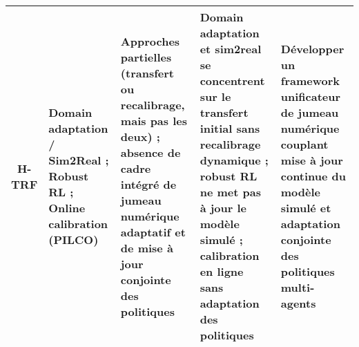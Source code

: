 \begin{table}[ht]
{\begin{tabularx}{\textwidth}{cXXXX}
      \textbf{H-TRF}
       & Domain adaptation / Sim2Real ; Robust RL ; Online calibration (PILCO)
       & Approches partielles (transfert ou recalibrage, mais pas les deux) ; absence de cadre intégré de jumeau numérique adaptatif et de mise à jour conjointe des politiques
       & Domain adaptation et sim2real se concentrent sur le transfert initial sans recalibrage dynamique ; robust RL ne met pas à jour le modèle simulé ; calibration en ligne sans adaptation des politiques
       & Développer un framework unificateur de jumeau numérique couplant mise à jour continue du modèle simulé et adaptation conjointe des politiques multi-agents                                            \\
      \hline
    \end{tabularx}
  }
\end{table}
